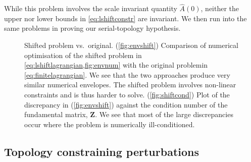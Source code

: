 \documentclass[12pt]{article}
\newcommand{\fundm}{Z}
\newcommand{\fund}{\mathbf{\fundm}}
\begin{document}
While this problem involves the scale invariant quantity \(\hat{A}(0)\), neither the upper nor lower bounds in \cref{eq:lshiftconstr} are invariant.
We then run into the same problems in proving our serial-topology hypothesis.

\begin{figure}[ht]
\begin{center}
\begin{myenuma}
  \item {}
  \label{fig:envshift}
  \item {}
  \label{fig:shiftcond}
\end{myenuma}
\caption[Shifted problem vs.\ original]{Shifted problem vs.\ original.
(\ref*{fig:envshift}) Comparison of numerical optimisation of the shifted problem in \cref{eq:lshiftlagrangian,fig:envnum} with the original problemin \cref{eq:finitelagrangian}.
We see that the two approaches produce very similar numerical envelopes.
The shifted problem involves non-linear constraints and is thus harder to solve.
(\ref{fig:shiftcond}) Plot of the discrepancy in (\ref*{fig:envshift}) against the condition number of the fundamental matrix, \(\fund \).
We see that most of the large discrepancies occur where the problem is numerically ill-conditioned.
\label{fig:shifted}}
\end{center}
\end{figure}


\subsection{Topology constraining perturbations}\label{sec:topology}
\end{document}
